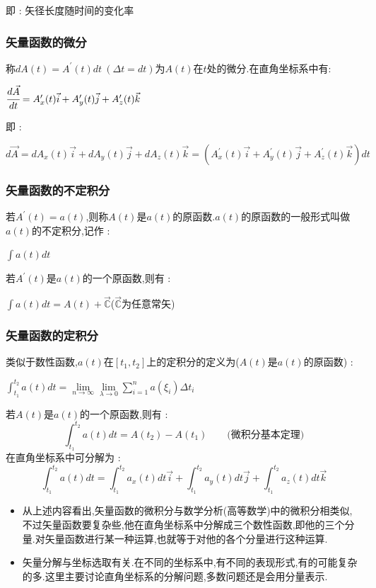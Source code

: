 \documentclass[UTF8,12pt]{ctexbook}
\newcommand{\limNormal}[1]{\lim\limits_{#1}}
\newcommand{\derivative}{^\prime}
\newcommand{\upDownSum}[2]{\sum\limits_{#2}^{#1}}
\newcommand{\definiteIntegral}[2]{\int^{#1}_{#2}}
\newcommand{\mathConstant}{\mathbb{C}}
\begin{document}
{{{{{      即 : 矢径长度随时间的变化率
    }%

    \subsubsection{矢量函数的微分}{
      称$dA(t) = A\derivative(t)dt\ (\Delta t = dt)$为$A(t)$在$t$处的微分.在直角坐标系中有:

      $\cfrac{d\vec{A}}{dt} = A\derivative_x(t)\vec{i} + A\derivative_y(t)\vec{j} + A\derivative_z(t)\vec{k}$

      即 :

      $d\vec{A} = dA_x(t)\vec{i} + dA_y(t)\vec{j} + dA_z(t)\vec{k} = (A\derivative_x(t)\vec{i} + A\derivative_y(t)\vec{j} + A\derivative_z(t)\vec{k})dt$
    }%

    \subsubsection{矢量函数的不定积分}{
      若$A\derivative(t) = a(t)$,则称$A(t)$是$a(t)$的原函数.$a(t)$的原函数的一般形式叫做$a(t)$的不定积分,记作 :

      $\int a(t)dt$

      若$A\derivative(t)$是$a(t)$的一个原函数,则有 :

      $\int a(t)dt = A(t) + \vec{\mathConstant}$\qquad ($\vec{\mathConstant}$为任意常矢)
    }

    \subsubsection{矢量函数的定积分}{
      类似于数性函数,$a(t)$在$[t_1,t_2]$上的定积分的定义为($A(t)\mbox{是}a(t)$的原函数) :

      $\definiteIntegral{t_2}{t_1}a(t)dt = \limNormal{n \to \infty}\limNormal{\lambda \to 0}\upDownSum{n}{i = 1}a(\xi_i)\Delta t_i$

      若$A(t)$是$a(t)$的一个原函数,则有 :
      $$
        \definiteIntegral{t_2}{t_1}a(t)dt = A(t_2) - A(t_1)\qquad \mbox{(微积分基本定理)}
      $$
      在直角坐标系中可分解为 :
      $$
        \definiteIntegral{t_2}{t_1}a(t)dt = \definiteIntegral{t_2}{t_1}a_x(t)dt\vec{i} + \definiteIntegral{t_2}{t_1}a_y(t)dt\vec{j} + \definiteIntegral{t_2}{t_1}a_z(t)dt\vec{k}
      $$
    }%

    \begin{itemize}
      \item 从上述内容看出,矢量函数的微积分与数学分析(高等数学)中的微积分相类似,不过矢量函数要复杂些,他在直角坐标系中分解成三个数性函数,即他的三个分量.对矢量函数进行某一种运算,也就等于对他的各个分量进行这种运算.
      \item 矢量分解与坐标选取有关.在不同的坐标系中,有不同的表现形式,有的可能复杂的多.这里主要讨论直角坐标系的分解问题,多数问题还是会用分量表示.
    \end{itemize}

}}}}
\end{document}
